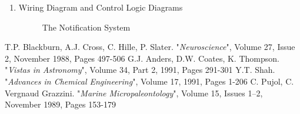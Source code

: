 \documentclass[a4paper,13pt]{article}
\begin{document}
\begin{enumerate}
\item Wiring Diagram and Control Logic Diagrams \\
\begin{figure}[!ht]  %
\centering
{}
\caption{The Notification System} %
\end{figure}
\end{enumerate}

\begin{thebibliography}{9}

T.P. Blackburn, A.J. Cross, C. Hille, P. Slater. "\emph{Neuroscience}", Volume 27, Issue 2, November 1988, Pages 497-506
G.J. Anders, D.W. Coates, K. Thompson. "\emph{Vistas in Astronomy}", Volume 34, Part 2, 1991, Pages 291-301
Y.T. Shah. "\emph{Advances in Chemical Engineering}", Volume 17, 1991, Pages 1-206
C. Pujol, C. Vergnaud Grazzini. "\emph{Marine Micropaleontology}", Volume 15, Issues 1–2, November 1989, Pages 153-179
\end{thebibliography}
\end{document}
